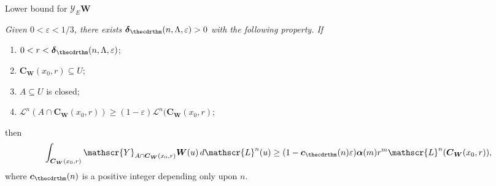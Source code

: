 \documentclass[JEP,XML,SOM,Unicode,ThmDefs,NoEqCountersInSection]{cedram}
\newenvironment{Empty}[2][\null]{%
\begin{enonce}[remark]{#1}#2}
{\end{enonce}}
\newcommand{\calL}{\mathscr{L}}
\newcommand{\calY}{\mathscr{Y}}
\newcommand{\balpha}{\boldsymbol{\alpha}}
\newcommand{\bdelta}{\boldsymbol{\delta}}
\newcommand{\bC}{{\boldsymbol{C}}}
\newcommand{\bW}{{\boldsymbol{W}}}
\newcommand{\bc}{{\boldsymbol{c}}}
\let\veps\varepsilon
\let\subset\subseteq
\begin{document}
\begin{Empty}[Lower bound for $\calY_E \bW$]
\label{54}
{\it
Given $0 < \veps < 1/3$, there exists $\bdelta_{\thecdrthm}(n,\Lambda,\veps)>0$ with the following property. If
\begin{enumerate}
\item\label{enum:54.1} $0 < r < \bdelta_{\thecdrthm}(n,\Lambda,\veps)$;
\item\label{enum:54.2} $\bC_\bW(x_0,r) \subset U$;
\item\label{enum:54.3} $A \subset U$ is closed;
\item\label{enum:54.4} $\calL^n \left(A \cap \bC_\bW(x_0,r) \right) \geq (1 - \veps) \calL^n (\bC_\bW(x_0,r)$;
\end{enumerate}
then
\begin{equation*}
\int_{\bC_\bW(x_0,r)} \calY_{A \cap \bC_\bW(x_0,r)} \bW (u) \,d\calL^n(u) \geq (1 - \bc_{\thecdrthm}(n) \veps) \balpha(m)r^m\calL^n(\bC_\bW(x_0,r)),
\end{equation*}
where $\bc_{\thecdrthm}(n)$ is a positive integer depending only upon $n$.
}
\end{Empty}
\end{document}
